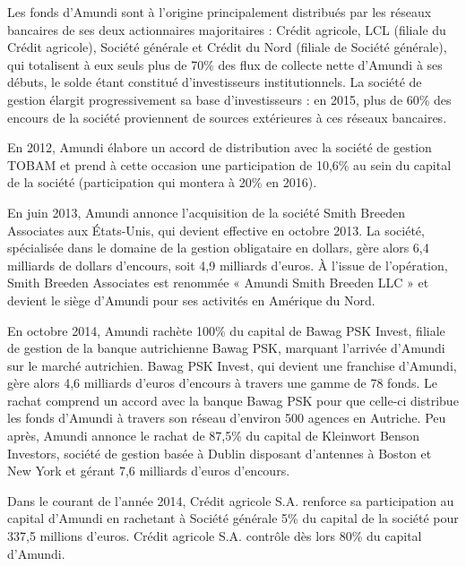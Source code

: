 \par Les fonds d'Amundi sont à l'origine principalement distribués par les réseaux bancaires de ses deux actionnaires majoritaires : Crédit agricole, LCL (filiale du Crédit agricole), Société générale et Crédit du Nord (filiale de Société générale), qui totalisent à eux seuls plus de 70\% des flux de collecte nette d'Amundi à ses débuts, le solde étant constitué d'investisseurs institutionnels. La société de gestion élargit progressivement sa base d'investisseurs : en 2015, plus de 60\% des encours de la société proviennent de sources extérieures à ces réseaux bancaires.
\par En 2012, Amundi élabore un accord de distribution avec la société de gestion TOBAM et prend à cette occasion une participation de 10,6\% au sein du capital de la société (participation qui montera à 20\% en 2016).
\par En juin 2013, Amundi annonce l'acquisition de la société Smith Breeden Associates aux États-Unis, qui devient effective en octobre 2013. La société, spécialisée dans le domaine de la gestion obligataire en dollars, gère alors 6,4 milliards de dollars d'encours, soit 4,9 milliards d'euros. À l'issue de l'opération, Smith Breeden Associates est renommée « Amundi Smith Breeden LLC » et devient le siège d'Amundi pour ses activités en Amérique du Nord.
\par En octobre 2014, Amundi rachète 100\% du capital de Bawag PSK Invest, filiale de gestion de la banque autrichienne Bawag PSK, marquant l'arrivée d'Amundi sur le marché autrichien. Bawag PSK Invest, qui devient une franchise d'Amundi, gère alors 4,6 milliards d'euros d'encours à travers une gamme de 78 fonds. Le rachat comprend un accord avec la banque Bawag PSK pour que celle-ci distribue les fonds d'Amundi à travers son réseau d'environ 500 agences en Autriche. Peu après, Amundi annonce le rachat de 87,5\% du capital de Kleinwort Benson Investors, société de gestion basée à Dublin disposant d'antennes à Boston et New York et gérant 7,6 milliards d'euros d'encours.
\par Dans le courant de l'année 2014, Crédit agricole S.A. renforce sa participation au capital d'Amundi en rachetant à Société générale 5\% du capital de la société pour 337,5 millions d'euros. Crédit agricole S.A. contrôle dès lors 80\% du capital d'Amundi.

